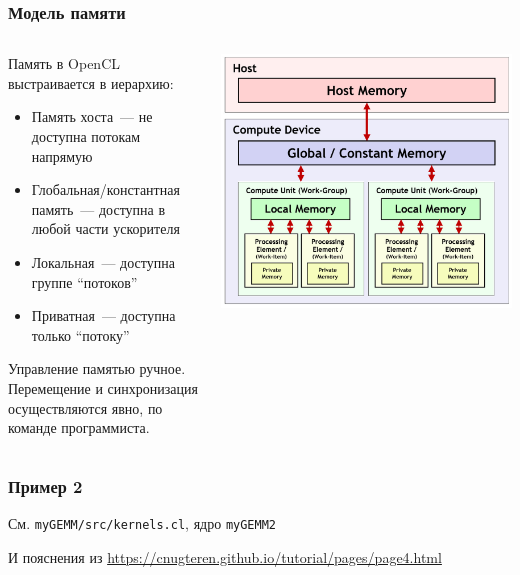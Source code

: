 \documentclass[
    aspectratio=169,
]{beamer}
\begin{document}
\begin{frame}
    \frametitle{Модель памяти}

    \begin{columns}[T]
        \begin{column}{0.5\textwidth}
            Память в OpenCL выстраивается в иерархию:
            \begin{itemize}
                \item Память хоста~--- не доступна потокам напрямую
                \item Глобальная/константная память~--- доступна в любой части ускорителя
                \item Локальная~--- доступна группе \enquote{потоков}
                \item Приватная~--- доступна только \enquote{потоку}
            \end{itemize}
            Управление памятью ручное.
            Перемещение и синхронизация осуществляются явно, по команде программиста.
        \end{column}
        \begin{column}{0.5\textwidth}
            \includegraphics[width=\linewidth]{memory_model.jpg}
        \end{column}
    \end{columns}

\end{frame}

\begin{frame}
    \frametitle{Пример 2}

    См. \texttt{myGEMM/src/kernels.cl}, ядро \texttt{myGEMM2}

    И пояснения из \url{https://cnugteren.github.io/tutorial/pages/page4.html}

\end{frame}
\end{document}
